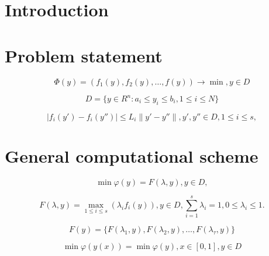 \documentclass[runningheads]{llncs}
\begin{document}
\section{Introduction}
\label{sec:1}

\cite{Miettinen1999,Ehrgott2005,Pardalos2017,ML_MCO_2023,Evtushenko2014,Deb2002,Durillo2010,Mostaghim2007,NDG09,RC05,ZLT01,Gergel2019_2,Gergel2018,GergelKozinov2020,Marler2004,Strongin2000,Sergeyev2013,SVM_2000,PROB_2004,iOpt_url,Grishagin2015_2}

\section{Problem statement}
\label{sec:2}

\begin{equation}
\label{eq:01}
  \Phi(y) = (f_1 (y),f_2 (y), \dots, f(y)) \to \min, y \in D
\end{equation}

\begin{equation}
\label{eq:02}
    D=\{y \in R^n : a_i \leq y_i \leq b_i, 1 \leq i \leq N\}
\end{equation}


\begin{equation}
\label{eq:03}
|f_i (y') - f_i (y'')| \leq L_i \|y' - y''\| ,y',y'' \in D, 1 \leq i \leq s,
\end{equation}

\section{General computational scheme}
\label{sec:3}

\begin{equation}
\label{eq:04}
\min \varphi(y) = F( \lambda, y ), y \in D,
\end{equation}


\begin{equation}
\label{eq:05}
F(\lambda, y) = \max_{1 \leq i \leq s} {(\lambda_i f_i (y))}, y \in D, \sum_{i=1}^s {\lambda_i} = 1, 0 \leq \lambda_i \leq 1.
\end{equation}


\begin{equation}
\label{eq:06}
F(y) = \{ F(\lambda_1,y),F(\lambda_2,y), \dots ,F(\lambda_\tau,y)\}
\end{equation}


\begin{equation}
\label{eq:07}
\min{\varphi(y(x))} = \min {\varphi(y)}, x \in [0,1], y \in D
\end{equation}
\end{document}
